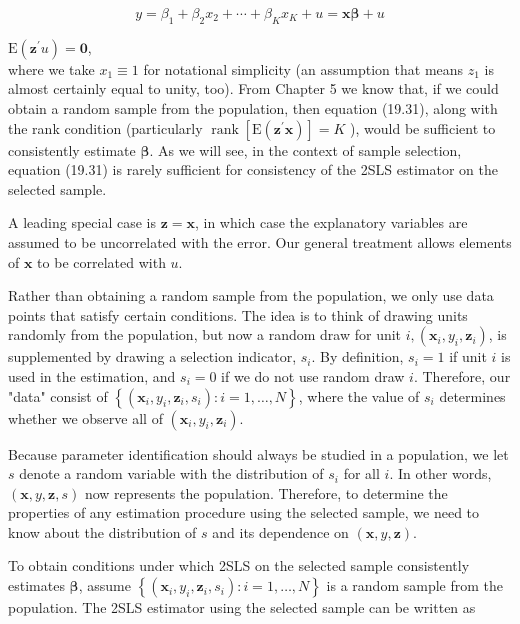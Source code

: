 \documentclass[10pt]{article}
\begin{document}
\begin{equation*}
y=\beta_{1}+\beta_{2} x_{2}+\cdots+\beta_{K} x_{K}+u=\mathbf{x} \boldsymbol{\beta}+u \tag{19.30}
\end{equation*}


$\mathrm{E}\left(\mathbf{z}^{\prime} u\right)=\mathbf{0}$,\\
where we take $x_{1} \equiv 1$ for notational simplicity (an assumption that means $z_{1}$ is almost certainly equal to unity, too). From Chapter 5 we know that, if we could obtain a random sample from the population, then equation (19.31), along with the rank condition (particularly $\operatorname{rank}\left[\mathrm{E}\left(\mathbf{z}^{\prime} \mathbf{x}\right)\right]=K$ ), would be sufficient to consistently estimate $\boldsymbol{\beta}$. As we will see, in the context of sample selection, equation (19.31) is rarely sufficient for consistency of the 2SLS estimator on the selected sample.

A leading special case is $\mathbf{z}=\mathbf{x}$, in which case the explanatory variables are assumed to be uncorrelated with the error. Our general treatment allows elements of $\mathbf{x}$ to be correlated with $u$.

Rather than obtaining a random sample from the population, we only use data points that satisfy certain conditions. The idea is to think of drawing units randomly from the population, but now a random draw for unit $i,\left(\mathbf{x}_{i}, y_{i}, \mathbf{z}_{i}\right)$, is supplemented by drawing a selection indicator, $s_{i}$. By definition, $s_{i}=1$ if unit $i$ is used in the estimation, and $s_{i}=0$ if we do not use random draw $i$. Therefore, our "data" consist of $\left\{\left(\mathbf{x}_{i}, y_{i}, \mathbf{z}_{i}, s_{i}\right): i=1, \ldots, N\right\}$, where the value of $s_{i}$ determines whether we observe all of $\left(\mathbf{x}_{i}, y_{i}, \mathbf{z}_{i}\right)$.

Because parameter identification should always be studied in a population, we let $s$ denote a random variable with the distribution of $s_{i}$ for all $i$. In other words, $(\mathbf{x}, y, \mathbf{z}, s)$ now represents the population. Therefore, to determine the properties of any estimation procedure using the selected sample, we need to know about the distribution of $s$ and its dependence on $(\mathbf{x}, y, \mathbf{z})$.

To obtain conditions under which 2SLS on the selected sample consistently estimates $\boldsymbol{\beta}$, assume $\left\{\left(\mathbf{x}_{i}, y_{i}, \mathbf{z}_{i}, s_{i}\right): i=1, \ldots, N\right\}$ is a random sample from the population. The 2SLS estimator using the selected sample can be written as
\end{document}
